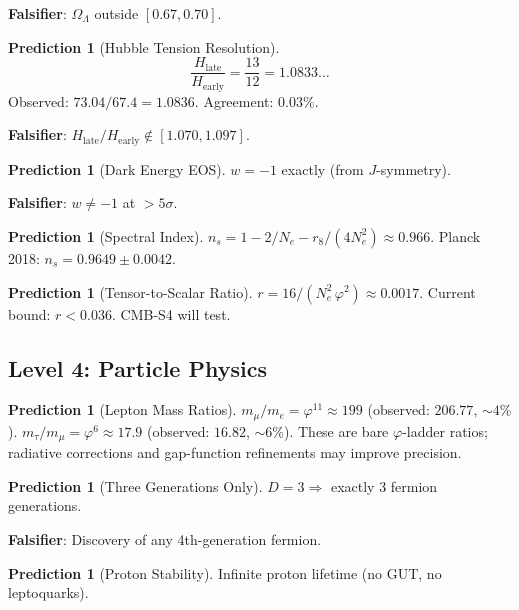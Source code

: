 \documentclass[12pt,a4paper]{article}
\theoremstyle{definition}
\newtheorem{prediction}[theorem]{Prediction}
\theoremstyle{remark}
\begin{document}
\textbf{Falsifier}: $\Omega_\Lambda$ outside $[0.67, 0.70]$.

\begin{prediction}[Hubble Tension Resolution]
\begin{equation}
  \frac{H_{\mathrm{late}}}{H_{\mathrm{early}}} = \frac{13}{12} =
  1.0833\ldots
\end{equation}
Observed: $73.04/67.4 = 1.0836$.  Agreement: $0.03\%$.
\end{prediction}

\textbf{Falsifier}: $H_{\mathrm{late}}/H_{\mathrm{early}} \notin
[1.070, 1.097]$.

\begin{prediction}[Dark Energy EOS]
$w = -1$ exactly (from $J$-symmetry).
\end{prediction}

\textbf{Falsifier}: $w \neq -1$ at $> 5\sigma$.

\begin{prediction}[Spectral Index]
$n_s = 1 - 2/N_e - r_8/(4N_e^2) \approx 0.966$.  Planck 2018:
$n_s = 0.9649 \pm 0.0042$.
\end{prediction}

\begin{prediction}[Tensor-to-Scalar Ratio]
$r = 16/(N_e^2\,\varphi^2) \approx 0.0017$.  Current bound:
$r < 0.036$.  CMB-S4 will test.
\end{prediction}

\subsection{Level 4: Particle Physics}

\begin{prediction}[Lepton Mass Ratios]
$m_\mu/m_e = \varphi^{11} \approx 199$ (observed: $206.77$,
$\sim 4\%$).  $m_\tau/m_\mu = \varphi^6 \approx 17.9$ (observed:
$16.82$, $\sim 6\%$).  These are bare $\varphi$-ladder ratios;
radiative corrections and gap-function refinements may improve
precision.
\end{prediction}

\begin{prediction}[Three Generations Only]
$D = 3 \Rightarrow$ exactly 3 fermion generations.
\end{prediction}

\textbf{Falsifier}: Discovery of any 4th-generation fermion.

\begin{prediction}[Proton Stability]
Infinite proton lifetime (no GUT, no leptoquarks).
\end{prediction}
\end{document}
